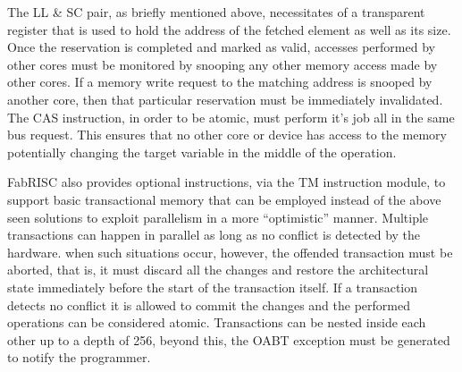         The LL \& SC pair, as briefly mentioned above, necessitates of a transparent register that is used to hold the address of the fetched element as well as its size. Once the reservation is completed and marked as valid, accesses performed by other cores must be monitored by snooping any other memory access made by other cores. If a memory write request to the matching address is snooped by another core, then that particular reservation must be immediately invalidated. The CAS instruction, in order to be atomic, must perform it's job all in the same bus request. This ensures that no other core or device has access to the memory potentially changing the target variable in the middle of the operation.

        \vspace{10pt}

        FabRISC also provides optional instructions, via the TM instruction module, to support basic transactional memory that can be employed instead of the above seen solutions to exploit parallelism in a more ``optimistic'' manner. Multiple transactions can happen in parallel as long as no conflict is detected by the hardware. when such situations occur, however, the offended transaction must be aborted, that is, it must discard all the changes and restore the architectural state immediately before the start of the transaction itself. If a transaction detects no conflict it is allowed to commit the changes and the performed operations can be considered atomic. Transactions can be nested inside each other up to a depth of 256, beyond this, the OABT exception must be generated to notify the programmer.

